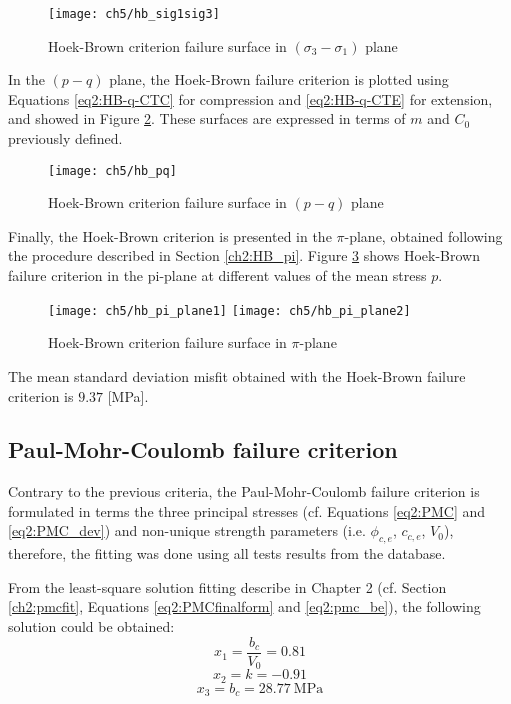 \begin{figure}[p]
    \centering
    \texttt{[image: ch5/hb\_sig1sig3]}
    \caption{Hoek-Brown criterion failure surface in  $(\sigma_3-\sigma_1)$ plane}
    \label{fig5:hb_sig1sig3}
\end{figure} 

In the $(p-q)$ plane, the Hoek-Brown failure criterion is plotted using Equations \ref{eq2:HB-q-CTC} for compression and \ref{eq2:HB-q-CTE} for extension, and showed in Figure \ref{fig5:hb_pq}. These surfaces are expressed in terms of $m$ and $C_0$ previously defined. 

\begin{figure}[p]
    \centering
    \texttt{[image: ch5/hb\_pq]}
    \caption{Hoek-Brown criterion failure surface in  $(p-q)$ plane}
    \label{fig5:hb_pq}
\end{figure} 

Finally, the Hoek-Brown criterion is presented in the $\pi$-plane, obtained following the procedure described in Section \ref{ch2:HB_pi}. Figure \ref{fig5:hb_pi_plane} shows Hoek-Brown failure criterion in the pi-plane at different values of the mean stress $p$.

\begin{figure}[tb]
    \centering
    \texttt{[image: ch5/hb\_pi\_plane1]}
    \texttt{[image: ch5/hb\_pi\_plane2]}
    \caption{Hoek-Brown criterion failure surface in  $\pi$-plane}
    \label{fig5:hb_pi_plane}
\end{figure} 

The mean standard deviation misfit obtained with the Hoek-Brown failure criterion is $9.37$ [\si{\mega\pascal}]. 

\subsection{Paul-Mohr-Coulomb failure criterion}\label{ch5:3p_pmc}

Contrary to the previous criteria, the Paul-Mohr-Coulomb failure criterion is formulated in terms the three principal stresses (cf. Equations \ref{eq2:PMC} and \ref{eq2:PMC_dev}) and non-unique strength parameters (i.e. $\phi_{c,e}$, $c_{c,e}$, $V_0$), therefore, the fitting was done using all tests results from the database. 

From the least-square solution fitting describe in Chapter 2 (cf. Section \ref{ch2:pmcfit}, Equations \ref{eq2:PMCfinalform} and \ref{eq2:pmc_be}), the following solution could be obtained:
\begin{equation}
    x_1 = \frac{b_c}{V_0} = 0.81
\end{equation}
\begin{equation}
    x_2 = k = -0.91
\end{equation}
\begin{equation}\label{eq5:pmc_bc}
    x_3 = b_c = \SI{28.77}{\mega\pascal}
\end{equation}

